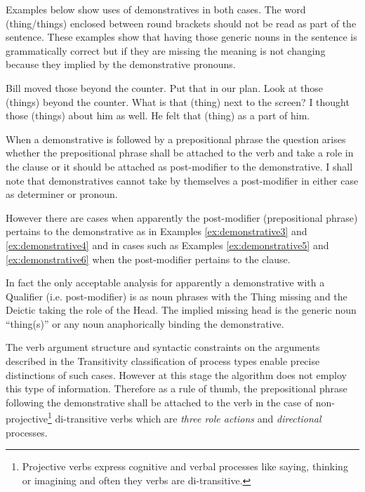     Examples below show uses of demonstratives in both cases. The word (thing/things) enclosed between round brackets should not be read as part of the sentence. These examples show that having those generic nouns in the sentence is grammatically correct but if they are missing the meaning is not changing because they implied by the demonstrative pronouns.

    \begin{exe}
        \ex\label{ex:demonstrative1} Bill moved those beyond the counter.
        \ex\label{ex:demonstrative2} Put that in our plan.
        \ex\label{ex:demonstrative3} Look at those (things) beyond the counter.
        \ex\label{ex:demonstrative4} What is that (thing) next to the screen?
        \ex\label{ex:demonstrative5} I thought those (things) about him as well.
        \ex\label{ex:demonstrative6} He felt that (thing) as a part of him. 
    \end{exe}

    When a demonstrative is followed by a prepositional phrase the question arises whether the prepositional phrase shall be attached to the verb and take a role in the clause or it should be attached as post-modifier to the demonstrative. I shall note that demonstratives cannot take by themselves a post-modifier in either case as determiner or pronoun. 

    However there are cases when apparently the post-modifier (prepositional phrase) pertains to the demonstrative as in Examples \ref{ex:demonstrative3} and \ref{ex:demonstrative4} and in cases such as Examples \ref{ex:demonstrative5} and \ref{ex:demonstrative6} when the post-modifier pertains to the clause. 

    In fact the only acceptable analysis for apparently a demonstrative with a Qualifier (i.e. post-modifier) is as noun phrases with the Thing missing and the Deictic taking the role of the Head. The implied missing head is the generic noun ``thing(s)'' or any noun anaphorically binding the demonstrative.

    The verb argument structure and syntactic constraints on the arguments described in the Transitivity classification of process types enable precise distinctions of such cases. However at this stage the algorithm does not employ this type of information. Therefore as a rule of thumb, the prepositional phrase following the demonstrative shall be attached to the verb in the case of non-projective\footnote{Projective verbs express cognitive and verbal processes like saying, thinking or imagining and often they verbs are di-transitive.} di-transitive verbs which are \textit{three role actions} and \textit{directional} processes.

